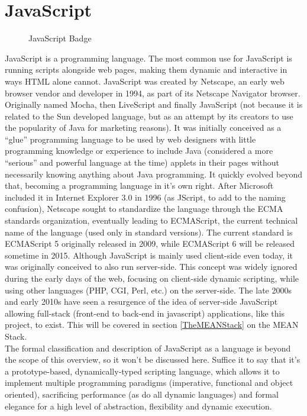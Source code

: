 \section{JavaScript} \label{JavaScript}
\begin{figure}[h]
\centering

\caption{JavaScript Badge}
\end{figure}
JavaScript is a programming language. The most common use for JavaScript is running scripts alongside web pages, making
them dynamic and interactive in ways HTML alone cannot. JavaScript was created by Netscape, an early web browser vendor
and developer in 1994, as part of its Netscape Navigator browser. Originally named Mocha, then LiveScript and finally
JavaScript (not because it is related to the Sun developed language, but as an attempt by its creators to use the
popularity of Java for marketing reasons). It was initially conceived as a ``glue'' programming language to be used by
web designers with little programming knowledge or experience to include Java (considered a more ``serious'' and powerful
language at the time) applets in their pages without necessarily knowing anything about Java programming. It quickly
evolved beyond that, becoming a programming language in it's own right. After Microsoft included it in Internet Explorer
3.0 in 1996 (as JScript, to add to the naming confusion), Netscape sought to standardize the language through the ECMA
standards organization, eventually leading to ECMAScript, the current technical name of the language (used only in
standard versions). The current standard is ECMAScript 5 originally released in 2009, while ECMAScript 6 will be released
sometime in 2015. Although JavaScript is mainly used client-side even today, it was originally conceived to also run
server-side. This concept was widely ignored during the early days of the web, focusing on client-side dynamic scripting,
while using other languages (PHP, CGI, Perl, etc.) on the server-side. The late 2000s and early 2010s have seen a
resurgence of the idea of server-side JavaScript allowing full-stack (front-end to back-end in javascript) applications,
like this project, to exist. This will be covered in section \ref{TheMEANStack} on the MEAN Stack.\\

The formal classification and description of JavaScript as a language is beyond the scope of this overview, so it won't
be discussed here. Suffice it to say that it's a prototype-based, dynamically-typed scripting language, which allows it
to implement multiple programming paradigms (imperative, functional and object oriented), sacrificing performance (as do
all dynamic languages) and formal elegance for a high level of abstraction, flexibility and dynamic execution.\\

